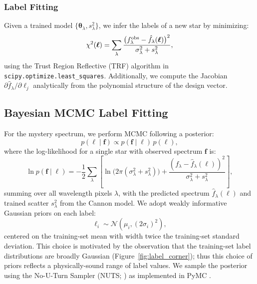 \documentclass[10pt,preprint2]{aastex}
\begin{document}
\subsubsection{Label Fitting}

Given a trained model $\{\boldsymbol{\theta}_\lambda, s_\lambda^2\}$, we infer the labels of a new star by minimizing:
\begin{equation}
  \chi^2(\boldsymbol{\ell}) = \sum_\lambda \frac{\bigl(f_\lambda^{\rm obs} - \hat{f}_\lambda(\boldsymbol{\ell})\bigr)^2}{\sigma_\lambda^2 + s_\lambda^2},
  \label{eq:cannon_chi2}
\end{equation}
using the Trust Region Reflective (TRF) algorithm in \texttt{scipy.optimize.least\_squares}. Additionally, we compute the Jacobian $\partial\hat{f}_\lambda/\partial\ell_j$ analytically from the polynomial structure of the design vector.

\subsection{Bayesian MCMC Label Fitting}

For the mystery spectrum, we perform MCMC following a posterior:
\begin{equation}
  p(\boldsymbol{\ell} \mid \mathbf{f}) \propto p(\mathbf{f} \mid \boldsymbol{\ell})\, p(\boldsymbol{\ell}),
\end{equation}
where the log-likelihood for a single star with observed spectrum $\mathbf{f}$ is:
\begin{equation}
  \ln p(\mathbf{f} \mid \boldsymbol{\ell}) = -\frac{1}{2}\sum_{\lambda} \left[ \ln\bigl(2\pi(\sigma_\lambda^2 + s_\lambda^2)\bigr) + \frac{(f_\lambda - \hat{f}_\lambda(\boldsymbol{\ell}))^2}{\sigma_\lambda^2 + s_\lambda^2} \right],
  \label{eq:mcmc_loglike}
\end{equation}
summing over all wavelength pixels $\lambda$, with the predicted spectrum $\hat{f}_\lambda(\boldsymbol{\ell})$ and trained scatter $s_\lambda^2$ from the Cannon model. We adopt weakly informative Gaussian priors on each label:
\begin{equation}
  \ell_i \sim \mathcal{N}(\mu_i, (2\sigma_i)^2),
  \label{eq:priors}
\end{equation}
centered on the training-set mean with width twice the training-set standard deviation. This choice is motivated by the observation that the training-set label distributions are broadly Gaussian (Figure~\ref{fig:label_corner}); thus this choice of priors reflects a physically-sound range of label values. We sample the posterior using the No-U-Turn Sampler (NUTS; \citealt{HoffmanGelman2014}) as implemented in PyMC \citep{Salvatier2016}.
\end{document}
